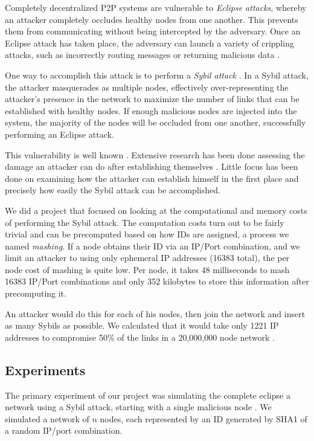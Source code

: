 Completely decentralized P2P systems are vulnerable to \textit{Eclipse attacks}, whereby an attacker completely occludes healthy nodes from one another.
This prevents them from communicating without being intercepted by the adversary.
Once an Eclipse attack has taken place, the adversary can launch a variety of crippling attacks, such as incorrectly routing messages or returning malicious data \cite{srivatsa2004vulnerabilities}.

One way to accomplish this attack is to perform a \emph{Sybil attack} \cite{sybil}.
In a Sybil attack, the attacker masquerades as multiple nodes, effectively over-representing the attacker's presence in the network to maximize the number of links that can be established with healthy nodes.
If enough malicious nodes are injected into the system, the majority of the nodes will be occluded from one another, successfully performing an Eclipse attack.


This vulnerability is well known \cite{dhtsec}.
Extensive research has been done assessing the damage an attacker can do after establishing themselves \cite{srivatsa2004vulnerabilities}.
Little focus has been done on examining how the attacker can establish himself in the first place and precisely how easily the Sybil attack can be accomplished.

We did a project that focused on looking at the computational and memory costs of performing the Sybil attack.
The computation costs turn out to be fairly trivial and can be precomputed based on how IDs are assigned, a process we named \textit{mashing}.
If a node obtains their ID via an IP/Port combination, and we limit an attacker to using only ephemeral IP addresses (16383 total), the per node cost of mashing is quite low.
Per node, it takes 48 milliseconds to mash 16383 IP/Port combinations and only 352 kilobytes to store this information after precomputing it.

An attacker would do this for each of his nodes, then join the network and insert as many Sybils as possible.
We calculated that it would take only 1221 IP addresses to compromise 50\% of the links in a 20,000,000 node network \cite{sybil-analysis}.


\subsection{Experiments}
The primary experiment of our project was simulating the complete eclipse a network using a Sybil attack, starting with a single malicious node \cite{sybil-analysis}.
We simulated a network of $n$ nodes, each represented by an ID generated by SHA1 of a random IP/port combination.

